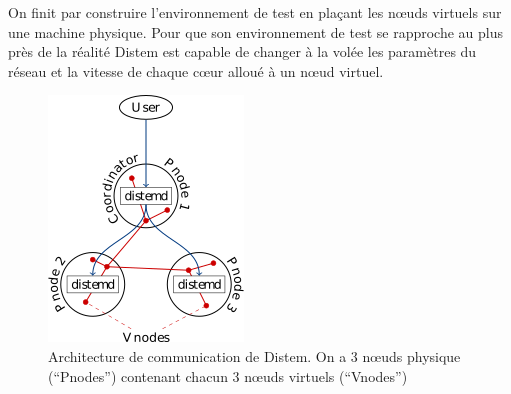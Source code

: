 On finit par construire l'environnement de test en plaçant les n\oe uds virtuels sur une machine physique. Pour que son environnement de test se rapproche au plus près de la réalité Distem est capable de changer à la volée les paramètres du réseau et la vitesse de chaque c\oe ur alloué à un n\oe ud virtuel.

\begin{figure}
  \centering
  \includegraphics{Pictures/png/Distem_architecture}
  \caption{Architecture de communication de Distem. On a 3 n\oe uds physique (``Pnodes'') contenant chacun 3 n\oe uds virtuels (``Vnodes'')}
  \label{Distem_archi}
\end{figure}

